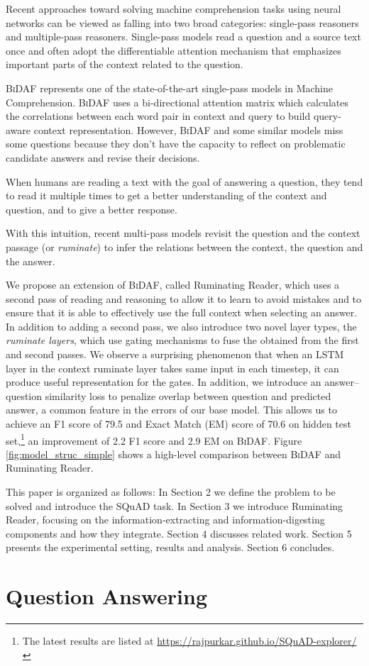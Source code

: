 \documentclass[11pt,letterpaper]{article}
\begin{document}
Recent approaches toward solving machine comprehension tasks using neural networks can be viewed as falling into two broad categories: single-pass reasoners and multiple-pass reasoners. Single-pass models read a question and a source text once and often adopt the differentiable attention mechanism that emphasizes important parts of the context related to the question. 


\textsc{BiDAF} \cite{Seo:2016tp} represents one of the state-of-the-art single-pass models in Machine Comprehension. \textsc{BiDAF} uses a bi-directional attention matrix which calculates the correlations between each word pair in context and query to build query-aware context representation. However, \textsc{BiDAF} and some similar models miss some questions because they don't have the capacity to reflect on problematic candidate answers and revise their decisions. 


When humans are reading a text with the goal of answering a question, they tend to read it multiple times to get a better understanding of the context and question, and to give a better response. 

With this intuition, recent multi-pass models revisit the question and the context passage (or \textit{ruminate}) to infer the relations between the context, the question and the answer. 

We propose an extension of \textsc{BiDAF}, called Ruminating Reader,  which uses a second pass of reading and reasoning to allow it to learn to avoid mistakes and to ensure that it is able to effectively use the full context when selecting an answer. In addition to adding a second pass, we also introduce two novel layer types, the \textit{ruminate layers}, which use gating mechanisms to fuse the obtained from the first and second passes. We observe a surprising phenomenon that when an LSTM layer in the context ruminate layer takes same input in each timestep, it can produce useful representation for the gates. In addition, we introduce an answer--question similarity loss to penalize overlap between question and predicted answer, a common feature in the errors of our base model. This allows us to achieve an F1 score of 79.5 and Exact Match (EM) score of 70.6 on hidden test set,\footnote{The latest results are listed at \url{https://rajpurkar.github.io/SQuAD-explorer/}} an improvement of 2.2 F1 score and 2.9 EM on \textsc{BiDAF}. Figure \ref{fig:model_struc_simple} shows a high-level comparison between \textsc{BiDAF} and Ruminating Reader.


This paper is organized as follows: In Section 2 we define the problem to be solved and introduce the SQuAD task. In Section 3 we introduce Ruminating Reader, focusing on the information-extracting and information-digesting components and how they integrate. Section 4 discusses related work. Section 5 presents the experimental setting, results and analysis. Section 6 concludes. \section{Question Answering}
\end{document}
